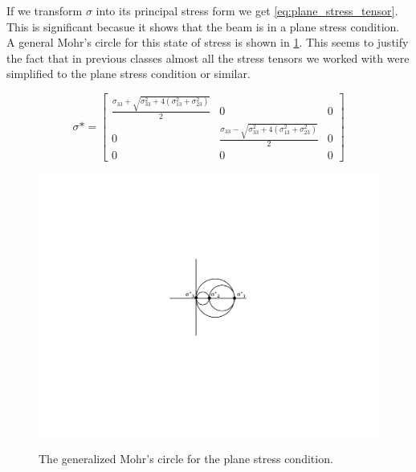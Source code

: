 If we transform $\sigma$ into its principal stress form we get \cref{eq:plane_stress_tensor}.
This is significant becasue it shows that the beam is in a plane stress condition. 
A general Mohr's circle for this state of stress is shown in \cref{fig:mohrs_circle}.
This seems to justify the fact that in previous classes almost all the stress tensors we worked with were simplified to the plane stress condition or similar. 

\begin{equation}
\sigma* = \begin{bmatrix}
 \frac{\sigma_{33} + \sqrt{\sigma_{33}^2 + 4(\sigma_{13}^2 + \sigma_{23}^2)}}{2} & 0 & 0 \\
0 &  \frac{\sigma_{33} - \sqrt{\sigma_{33}^2 + 4(\sigma_{13}^2 + \sigma_{23}^2)}}{2} & 0 \\
0 & 0 & 0
\end{bmatrix}
\label{eq:plane_stress_tensor}
\end{equation}

\begin{figure}
\centering
\includegraphics[width=0.95\columnwidth,trim=4cm 7cm 6cm 6.5cm, clip]{figs/mohrs_circle.pdf}
\label{fig:mohrs_circle}
\caption{The generalized Mohr's circle for the plane stress condition.}
\end{figure}

%
%

